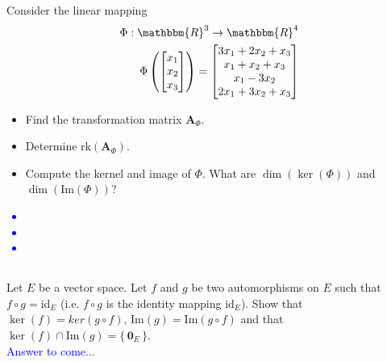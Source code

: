 \documentclass[a4paper,12pt]{article}
\newcommand{\Br}[1]{\{\, #1 \,\}}
\newcommand{\R}{\mathbbm{R}}
\newcommand{\M}[1]{ \begin{bmatrix} #1 \end{bmatrix} }
\newcommand{\vsp}[1]{\vspace{#1mm}\\}
\newcommand{\veco}{\textbf{0}}
\newcommand{\matA}{\textbf{A}}
\newcommand{\image}{\textrm{Im}}
\begin{document}
\subsection{}
Consider the linear mapping
\begin{align*}
\Phi: \R^3 \rightarrow \R^4 \\
\Phi \left(\M{x_1\\x_2\\x_3}\right) = \M{3x_1+2x_2+x_3\\x_1+x_2+x_3\\x_1-3x_2\\2x_1+3x_2+x_3}
\end{align*}
\begin{itemize}
 \item Find the transformation matrix $\matA_\Phi$.
 \item Determine rk$(\matA_\Phi)$.
 \item Compute the kernel and image of $\Phi$. What are $\dim(\ker(\Phi))$ and $\dim(\image(\Phi))$?
\end{itemize}
\textcolor{blue}{
\begin{itemize}
 \item 
 \item 
 \item 
\end{itemize}
}
\subsection{}
Let $E$ be a vector space. Let $f$ and $g$ be two automorphisms on $E$ such that $f \circ g = \textrm{id}_E$ (i.e. $f \circ g$ is the identity mapping $\textrm{id}_E$). Show that $\ker(f) = ker(g \circ f), \, \image(g) = \image(g \circ f)$ and that $\ker(f) \cap \image(g) = \Br{\veco_E}$.
\vsp{3}
\textcolor{blue}{
Answer to come...
}
\end{document}
